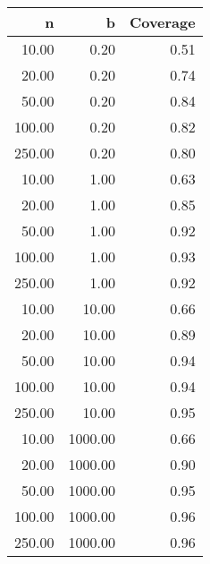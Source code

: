 
\begin{tabular}{rrr}
  \hline
n & b & Coverage \\ 
  \hline
10.00 & 0.20 & 0.51 \\ 
  20.00 & 0.20 & 0.74 \\ 
  50.00 & 0.20 & 0.84 \\ 
  100.00 & 0.20 & 0.82 \\ 
  250.00 & 0.20 & 0.80 \\ 
  10.00 & 1.00 & 0.63 \\ 
  20.00 & 1.00 & 0.85 \\ 
  50.00 & 1.00 & 0.92 \\ 
  100.00 & 1.00 & 0.93 \\ 
  250.00 & 1.00 & 0.92 \\ 
  10.00 & 10.00 & 0.66 \\ 
  20.00 & 10.00 & 0.89 \\ 
  50.00 & 10.00 & 0.94 \\ 
  100.00 & 10.00 & 0.94 \\ 
  250.00 & 10.00 & 0.95 \\ 
  10.00 & 1000.00 & 0.66 \\ 
  20.00 & 1000.00 & 0.90 \\ 
  50.00 & 1000.00 & 0.95 \\ 
  100.00 & 1000.00 & 0.96 \\ 
  250.00 & 1000.00 & 0.96 \\ 
   \hline
\end{tabular}